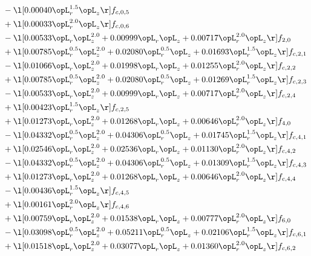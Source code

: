 \begin{alignat}{2}
& - \l[  0.00040 \opL_r^{1.5} \opL_z  \r] f_{c,0,5} \nonumber \\ 
& + \l[  0.00033 \opL_r^{2.0} \opL_z  \r] f_{c,0,6} \nonumber \\ 
& - \l[  0.00533 \opL_r \opL_z^{2.0} +  0.00999 \opL_r \opL_z +  0.00717 \opL_r^{2.0} \opL_z  \r] f_{2,0} \nonumber \\ 
& + \l[  0.00785 \opL_r^{0.5} \opL_z^{2.0} +  0.02080 \opL_r^{0.5} \opL_z +  0.01693 \opL_r^{1.5} \opL_z  \r] f_{c,2,1} \nonumber \\ 
& - \l[  0.01066 \opL_r \opL_z^{2.0} +  0.01998 \opL_r \opL_z +  0.01255 \opL_r^{2.0} \opL_z  \r] f_{c,2,2} \nonumber \\ 
& + \l[  0.00785 \opL_r^{0.5} \opL_z^{2.0} +  0.02080 \opL_r^{0.5} \opL_z +  0.01269 \opL_r^{1.5} \opL_z  \r] f_{c,2,3} \nonumber \\ 
& - \l[  0.00533 \opL_r \opL_z^{2.0} +  0.00999 \opL_r \opL_z +  0.00717 \opL_r^{2.0} \opL_z  \r] f_{c,2,4} \nonumber \\ 
& + \l[  0.00423 \opL_r^{1.5} \opL_z  \r] f_{c,2,5} \nonumber \\ 
& + \l[  0.01273 \opL_r \opL_z^{2.0} +  0.01268 \opL_r \opL_z +  0.00646 \opL_r^{2.0} \opL_z  \r] f_{4,0} \nonumber \\ 
& - \l[  0.04332 \opL_r^{0.5} \opL_z^{2.0} +  0.04306 \opL_r^{0.5} \opL_z +  0.01745 \opL_r^{1.5} \opL_z  \r] f_{c,4,1} \nonumber \\ 
& + \l[  0.02546 \opL_r \opL_z^{2.0} +  0.02536 \opL_r \opL_z +  0.01130 \opL_r^{2.0} \opL_z  \r] f_{c,4,2} \nonumber \\ 
& - \l[  0.04332 \opL_r^{0.5} \opL_z^{2.0} +  0.04306 \opL_r^{0.5} \opL_z +  0.01309 \opL_r^{1.5} \opL_z  \r] f_{c,4,3} \nonumber \\ 
& + \l[  0.01273 \opL_r \opL_z^{2.0} +  0.01268 \opL_r \opL_z +  0.00646 \opL_r^{2.0} \opL_z  \r] f_{c,4,4} \nonumber \\ 
& - \l[  0.00436 \opL_r^{1.5} \opL_z  \r] f_{c,4,5} \nonumber \\ 
& + \l[  0.00161 \opL_r^{2.0} \opL_z  \r] f_{c,4,6} \nonumber \\ 
& + \l[  0.00759 \opL_r \opL_z^{2.0} +  0.01538 \opL_r \opL_z +  0.00777 \opL_r^{2.0} \opL_z  \r] f_{6,0} \nonumber \\ 
& - \l[  0.03098 \opL_r^{0.5} \opL_z^{2.0} +  0.05211 \opL_r^{0.5} \opL_z +  0.02106 \opL_r^{1.5} \opL_z  \r] f_{c,6,1} \nonumber \\ 
& + \l[  0.01518 \opL_r \opL_z^{2.0} +  0.03077 \opL_r \opL_z +  0.01360 \opL_r^{2.0} \opL_z  \r] f_{c,6,2} \nonumber \\ 

\end{alignat}
